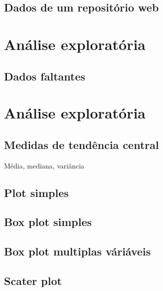 \documentclass[
]{book}
\begin{document}
\hypertarget{dados-de-um-reposituxf3rio-web}{%
\subsection{Dados de um repositório web}\label{dados-de-um-reposituxf3rio-web}}

\hypertarget{anuxe1lise-exploratuxf3ria}{%
\section{Análise exploratória}\label{anuxe1lise-exploratuxf3ria}}

\hypertarget{dados-faltantes}{%
\subsection{Dados faltantes}\label{dados-faltantes}}

\hypertarget{anuxe1lise-exploratuxf3ria-1}{%
\section{Análise exploratória}\label{anuxe1lise-exploratuxf3ria-1}}

\hypertarget{medidas-de-tenduxeancia-central}{%
\subsection{Medidas de tendência central}\label{medidas-de-tenduxeancia-central}}

Média, mediana, variância

\hypertarget{plot-simples}{%
\subsection{Plot simples}\label{plot-simples}}

\hypertarget{box-plot-simples}{%
\subsection{Box plot simples}\label{box-plot-simples}}

\hypertarget{box-plot-multiplas-vuxe1riuxe1veis}{%
\subsection{Box plot multiplas váriáveis}\label{box-plot-multiplas-vuxe1riuxe1veis}}

\hypertarget{scater-plot}{%
\subsection{Scater plot}\label{scater-plot}}
\end{document}
